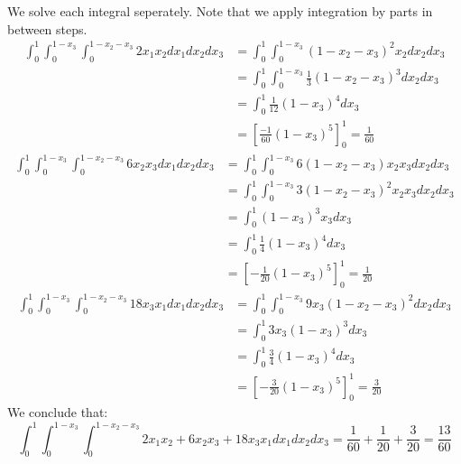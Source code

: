 \documentclass[11pt]{article}
\begin{document}
\begin{solution}
We solve each integral seperately. Note that we apply integration by parts in between steps. 
    \begin{align*}
        \int_{0}^{1}\int_{0}^{1 - x_3}\int_{0}^{1 - x_2 - x_3} 2x_1x_2 dx_1 dx_2 dx_3
        &= \int_{0}^{1}\int_{0}^{1 - x_3} (1-x_2-x_3)^2 x_2 dx_2 dx_3\\
        &= \int_{0}^{1}\int_{0}^{1 - x_3} \frac{1}{3}(1-x_2-x_3)^3 dx_2 dx_3\\
        &= \int_{0}^{1} \frac{1}{12}(1-x_3)^4 dx_3\\
        &= \left[ \frac{-1}{60}(1-x_3)^5\right]_0^1 = \frac{1}{60}
    \end{align*}
    \begin{align*}
        \int_{0}^{1}\int_{0}^{1 - x_3}\int_{0}^{1 - x_2 - x_3} 6x_2x_3  dx_1 dx_2 dx_3 &= \int_{0}^{1}\int_{0}^{1 - x_3} 6(1 - x_2 - x_3) x_2 x_3   dx_2 dx_3 \\
	&= \int_{0}^{1}\int_{0}^{1 - x_3} 3(1 - x_2 - x_3)^2 x_2 x_3   dx_2 dx_3 \\
	&= \int_{0}^{1} (1 - x_3)^3 x_3   dx_3 \\
	&= \int_{0}^{1} \frac{1}{4}(1 - x_3)^4  dx_3 \\
	&= \left[-\frac{1}{20}(1 - x_3)^5 \right]_0^1 = \frac{1}{20}
    \end{align*}
	\begin{align*}
         \int_{0}^{1}\int_{0}^{1 - x_3}\int_{0}^{1 - x_2 - x_3} 18x_3x_1 dx_1 dx_2 dx_3&= \int_{0}^{1}\int_{0}^{1 - x_3} 9x_3(1-x_2-x_3)^2   dx_2 dx_3 \\
        &=\int_{0}^{1} 3x_3(1-x_3)^3  dx_3 \\
        &= \int_{0}^{1} \frac{3}{4}(1-x_3)^4  dx_3 \\
        &= \left[-\frac{3}{20}(1-x_3)^5  \right]_0^1 =\frac{3}{20}
    \end{align*}
    We conclude that:
    $$
    \int_{0}^{1}\int_{0}^{1 - x_3}\int_{0}^{1 - x_2 - x_3} 2x_1x_2 + 6x_2x_3 + 18x_3x_1 dx_1 dx_2 dx_3 = \frac{1}{60} + \frac{1}{20} + \frac{3}{20} = \frac{13}{60}
    $$
\end{solution}
\end{document}
